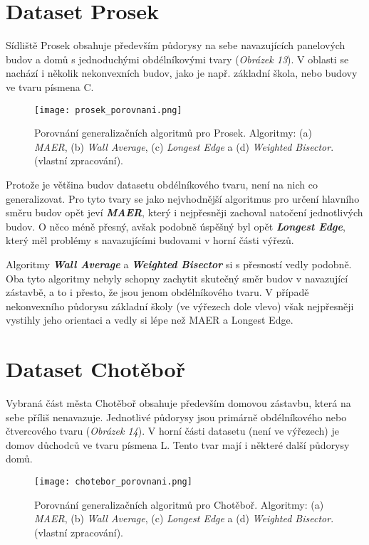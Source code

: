 \section*{Dataset Prosek}
\par Sídliště Prosek obsahuje především půdorysy na sebe navazujících panelových budov a domů s jednoduchými obdélníkovými tvary (\emph{Obrázek 13}). V oblasti se nachází i několik nekonvexních budov, jako je např. základní škola, nebo budovy ve tvaru písmena C.    

\begin{figure}[h]
\centering
\texttt{[image: prosek\_porovnani.png]}
    \caption{Porovnání generalizačních algoritmů pro Prosek. Algoritmy: (a) \emph{MAER}, (b) \emph{Wall Average}, (c) \emph{Longest Edge} a (d) \emph{Weighted Bisector}. (vlastní zpracování).}
\end{figure}

\par Protože je většina budov datasetu obdélníkového tvaru, není na nich co generalizovat. Pro tyto tvary se jako nejvhodnější algoritmus pro určení hlavního směru budov opět jeví \textbf{\emph{MAER}}, který i nejpřesněji zachoval natočení jednotlivých budov. O něco méně přesný, avšak podobně úspěšný byl opět \textbf{\emph{Longest Edge}}, který měl problémy s navazujícími budovami v horní části výřezů. 
\par Algoritmy \textbf{\emph{Wall Average}} a \textbf{\emph{Weighted Bisector}} si s přesností vedly podobně. Oba tyto algoritmy nebyly schopny zachytit skutečný směr budov v navazující zástavbě, a to i přesto, že jsou jenom obdélníkového tvaru. V případě nekonvexního půdorysu základní školy (ve výřezech dole vlevo) však nejpřesněji vystihly jeho orientaci a vedly si lépe než MAER a Longest Edge.

\section*{Dataset Chotěboř}

\par Vybraná část města Chotěboř obsahuje především domovou zástavbu, která na sebe příliš nenavazuje. Jednotlivé půdorysy jsou primárně obdélníkového nebo čtvercového tvaru (\emph{Obrázek 14}). V horní části datasetu (není ve výřezech) je domov důchodců ve tvaru písmena L. Tento tvar mají i některé další půdorysy domů. 

\begin{figure}[h]
\centering
\texttt{[image: chotebor\_porovnani.png]}
    \caption{Porovnání generalizačních algoritmů pro Chotěboř. Algoritmy: (a) \emph{MAER}, (b) \emph{Wall Average}, (c) \emph{Longest Edge} a (d) \emph{Weighted Bisector}.  (vlastní zpracování).}
\end{figure}

